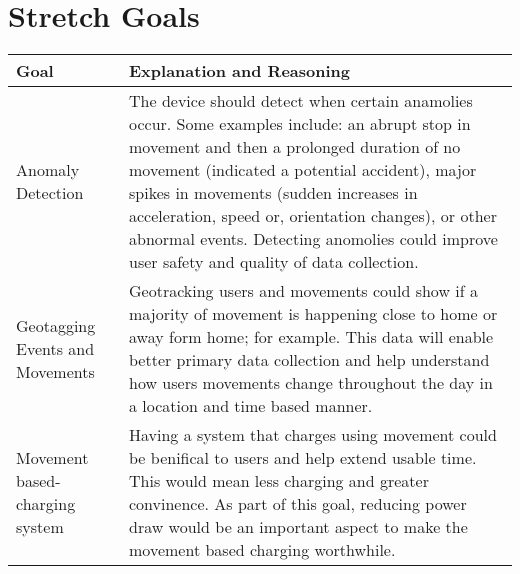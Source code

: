 \documentclass[12pt]{article}
\begin{document}
\section{Stretch Goals}
\begin{center}
    \begin{tabular}{ | m{7em} | m{32em}| }
        \hline
        \textbf{Goal}                   & \textbf{Explanation and Reasoning}                                                                                                                                                                                                                                                                                                                                                           \\
        \hline
        Anomaly \linebreak Detection               & The device should detect when certain anamolies occur. Some examples include: an abrupt stop in movement and then a prolonged duration of no movement (indicated a potential accident), major spikes in movements (sudden increases in acceleration, speed or, orientation changes), or other abnormal events. Detecting anomolies could improve user safety and quality of data collection. \\
        \hline
        Geotagging Events and Movements & Geotracking users and movements could show if a majority of movement is happening close to home or away form home; for example. This data will enable better primary data collection and help understand how users movements change throughout the day in a location and time based manner.                                                                                                  \\
        \hline
        Movement based-charging system  & Having a system that charges using movement could be benifical to users and help extend usable time. This would mean less charging and greater convinence. As part of this goal, reducing power draw would be an important aspect to make the movement based charging worthwhile.                                                                                                            \\
        \hline
    \end{tabular}
\end{center}
\end{document}
